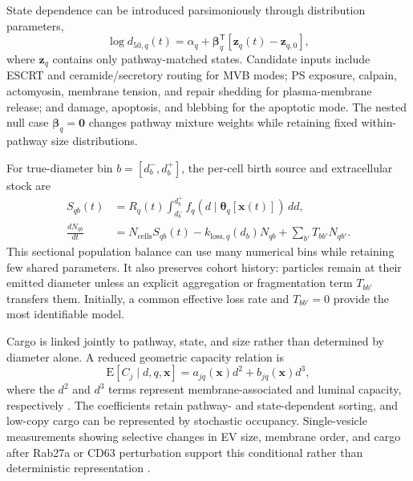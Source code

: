 State dependence can be introduced parsimoniously through distribution parameters,
\begin{equation*}
\log d_{50,q}(t)=\alpha_q+
\boldsymbol{\beta}_q^{\mathsf{T}}
\left[\mathbf{z}_q(t)-\mathbf{z}_{q,0}\right],
\end{equation*}
where $\mathbf{z}_q$ contains only pathway-matched states. Candidate inputs include ESCRT and ceramide/secretory routing for MVB modes; PS exposure, calpain, actomyosin, membrane tension, and repair shedding for plasma-membrane release; and damage, apoptosis, and blebbing for the apoptotic mode. The nested null case $\boldsymbol{\beta}_q=\mathbf{0}$ changes pathway mixture weights while retaining fixed within-pathway size distributions.

For true-diameter bin $b=[d_b^-,d_b^+]$, the per-cell birth source and extracellular stock are
\begin{align*}
S_{qb}(t)
&=R_q(t)\int_{d_b^-}^{d_b^+}
f_q\!\left(d\mid\boldsymbol{\theta}_q[\mathbf{x}(t)]\right)\,dd,\\
\frac{dN_{qb}}{dt}
&=N_{\mathrm{cells}}S_{qb}(t)
-k_{\mathrm{loss},q}(d_b)N_{qb}
+\sum_{b'}T_{bb'}N_{qb'}.
\end{align*}
This sectional population balance can use many numerical bins while retaining few shared parameters. It also preserves cohort history: particles remain at their emitted diameter unless an explicit aggregation or fragmentation term $T_{bb'}$ transfers them. Initially, a common effective loss rate and $T_{bb'}=0$ provide the most identifiable model.

Cargo is linked jointly to pathway, state, and size rather than determined by diameter alone. A reduced geometric capacity relation is
\begin{equation*}
\mathrm{E}[C_j\mid d,q,\mathbf{x}]
=a_{jq}(\mathbf{x})d^2+b_{jq}(\mathbf{x})d^3,
\end{equation*}
where the $d^2$ and $d^3$ terms represent membrane-associated and luminal capacity, respectively \cite{zendrini2022surface}. The coefficients retain pathway- and state-dependent sorting, and low-copy cargo can be represented by stochastic occupancy. Single-vesicle measurements showing selective changes in EV size, membrane order, and cargo after Rab27a or CD63 perturbation support this conditional rather than deterministic representation \cite{vonLersner2024multiparametric}.

